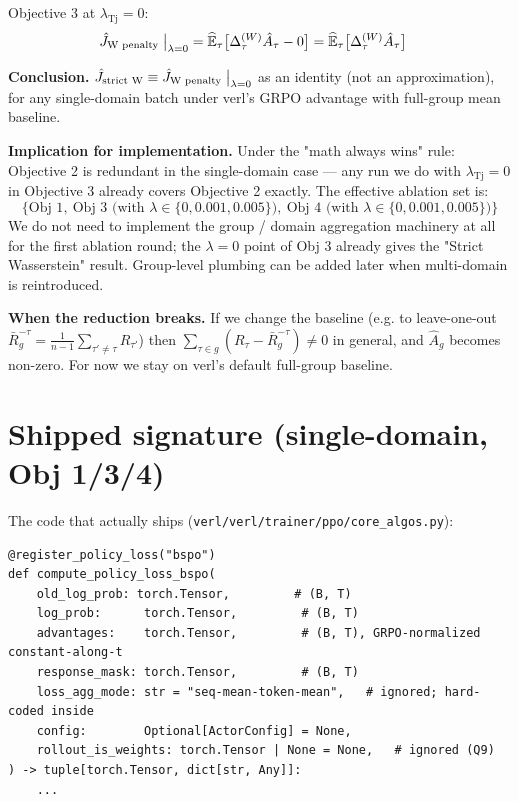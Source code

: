 \documentclass{article}
\begin{document}
Objective 3 at $\lambda_{\text{Tj}} = 0$:
\begin{align}
\hat J_{\text{W penalty}}\bigm|_{\lambda=0}
&= \widehat{\mathbb{E}}_\tau \bigl[\Delta_\tau^{(W)} \hat A_\tau - 0\bigr]
 = \widehat{\mathbb{E}}_\tau \bigl[\Delta_\tau^{(W)} \hat A_\tau \bigr]
\end{align}

\textbf{Conclusion.} $\hat J_{\text{strict W}} \equiv \hat J_{\text{W penalty}}\bigm|_{\lambda=0}$ as an identity (not an approximation), for any single-domain batch under verl's GRPO advantage with full-group mean baseline.

\textbf{Implication for implementation.} Under the "math always wins" rule:
Objective 2 is redundant in the single-domain case --- any run we do with
$\lambda_{\text{Tj}} = 0$ in Objective 3 already covers Objective 2
exactly. The effective ablation set is:
\[
\{\text{Obj 1}, \ \text{Obj 3 (with }\lambda\in\{0, 0.001, 0.005\}\text{)}, \ \text{Obj 4 (with }\lambda\in\{0, 0.001, 0.005\}\text{)}\}
\]
We do not need to implement the group / domain aggregation machinery at
all for the first ablation round; the $\lambda=0$ point of Obj 3 already
gives the "Strict Wasserstein" result. Group-level plumbing can be added
later when multi-domain is reintroduced.

\textbf{When the reduction breaks.} If we change the baseline (e.g. to
leave-one-out $\bar R_g^{-\tau} = \frac{1}{n-1}\sum_{\tau' \ne \tau} R_{\tau'}$)
then $\sum_{\tau \in g}(R_\tau - \bar R_g^{-\tau}) \ne 0$ in general, and
$\hat A_g$ becomes non-zero. For now we stay on verl's default full-group
baseline.

\section{Shipped signature (single-domain, Obj 1/3/4)}

The code that actually ships (\texttt{verl/verl/trainer/ppo/core\_algos.py}):

\begin{lstlisting}[caption={BSPO loss signature as shipped}]
@register_policy_loss("bspo")
def compute_policy_loss_bspo(
    old_log_prob: torch.Tensor,         # (B, T)
    log_prob:      torch.Tensor,         # (B, T)
    advantages:    torch.Tensor,         # (B, T), GRPO-normalized constant-along-t
    response_mask: torch.Tensor,         # (B, T)
    loss_agg_mode: str = "seq-mean-token-mean",   # ignored; hard-coded inside
    config:        Optional[ActorConfig] = None,
    rollout_is_weights: torch.Tensor | None = None,   # ignored (Q9)
) -> tuple[torch.Tensor, dict[str, Any]]:
    ...
\end{lstlisting}
\end{document}
